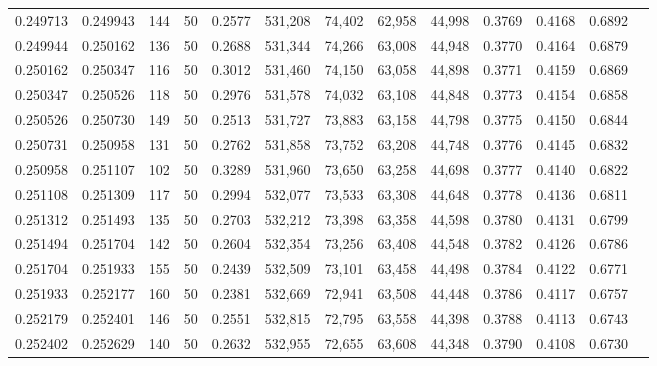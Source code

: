 \begin{tabular}{rrrrrrrrrrrrr}
0.249713 & 0.249943 &   144 &  50 &                                     0.2577 & 531,208 &  74,402 &  62,958 &  44,998 & 0.3769 & 0.4168 & 0.6892 \\
0.249944 & 0.250162 &   136 &  50 &                                     0.2688 & 531,344 &  74,266 &  63,008 &  44,948 & 0.3770 & 0.4164 & 0.6879 \\
0.250162 & 0.250347 &   116 &  50 &                                     0.3012 & 531,460 &  74,150 &  63,058 &  44,898 & 0.3771 & 0.4159 & 0.6869 \\
0.250347 & 0.250526 &   118 &  50 &                                     0.2976 & 531,578 &  74,032 &  63,108 &  44,848 & 0.3773 & 0.4154 & 0.6858 \\
0.250526 & 0.250730 &   149 &  50 &                                     0.2513 & 531,727 &  73,883 &  63,158 &  44,798 & 0.3775 & 0.4150 & 0.6844 \\
0.250731 & 0.250958 &   131 &  50 &                                     0.2762 & 531,858 &  73,752 &  63,208 &  44,748 & 0.3776 & 0.4145 & 0.6832 \\
0.250958 & 0.251107 &   102 &  50 &                                     0.3289 & 531,960 &  73,650 &  63,258 &  44,698 & 0.3777 & 0.4140 & 0.6822 \\
0.251108 & 0.251309 &   117 &  50 &                                     0.2994 & 532,077 &  73,533 &  63,308 &  44,648 & 0.3778 & 0.4136 & 0.6811 \\
0.251312 & 0.251493 &   135 &  50 &                                     0.2703 & 532,212 &  73,398 &  63,358 &  44,598 & 0.3780 & 0.4131 & 0.6799 \\
0.251494 & 0.251704 &   142 &  50 &                                     0.2604 & 532,354 &  73,256 &  63,408 &  44,548 & 0.3782 & 0.4126 & 0.6786 \\
0.251704 & 0.251933 &   155 &  50 &                                     0.2439 & 532,509 &  73,101 &  63,458 &  44,498 & 0.3784 & 0.4122 & 0.6771 \\
0.251933 & 0.252177 &   160 &  50 &                                     0.2381 & 532,669 &  72,941 &  63,508 &  44,448 & 0.3786 & 0.4117 & 0.6757 \\
0.252179 & 0.252401 &   146 &  50 &                                     0.2551 & 532,815 &  72,795 &  63,558 &  44,398 & 0.3788 & 0.4113 & 0.6743 \\
0.252402 & 0.252629 &   140 &  50 &                                     0.2632 & 532,955 &  72,655 &  63,608 &  44,348 & 0.3790 & 0.4108 & 0.6730 \\

\end{tabular}
